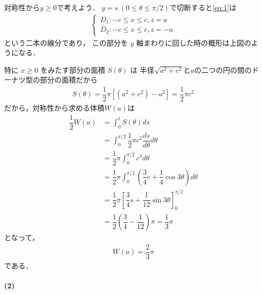 \documentclass[../../main.tex]{subfiles}
\begin{document}
対称性から$y \ge 0$で考えよう．
$y = s \ (0 \le \theta \le \pi/2)$で切断すると\cref{eq:1}は
\begin{align}
  \begin{cases}
    D_1: -c \le x \le c, z = a \\
    D_2: -c \le x \le c, z = -a
  \end{cases} \label{eq:2}
\end{align}
という二本の線分であり，
この部分を $y$ 軸まわりに回した時の概形は上図のようになる．

特に $x \ge 0$ をみたす部分の面積 $S(\theta)$ は
半径$\sqrt{a^2+c^2}$と$a$の二つの円の間のドーナツ型の部分の面積だから
\begin{align}
  S(\theta) = \dfrac{1}{2}\pi \left[ (a^2+c^2) - a^2 \right] = \dfrac{1}{2}\pi c^2
\end{align}
だから，対称性から求める体積$W(a)$は
\begin{align}
  \dfrac{1}{2} W(a)
  &= \int_{0}^{1} S(\theta) ds \\
  &= \int_{0}^{\pi/2} \dfrac{1}{2}\pi c^2 \dfrac{ds}{d\theta} d\theta \\
  &= \dfrac{1}{2}\pi \int_{0}^{\pi/2} c^3 d\theta \\
  &= \dfrac{1}{2}\pi \int_{0}^{\pi/2} \left( \dfrac{3}{4}c + \dfrac{1}{4} \cos 3\theta \right) d\theta \\
  &= \dfrac{1}{2}\pi \left[ \dfrac{3}{4}s + \dfrac{1}{12}\sin 3\theta \right]_{0}^{\pi/2} \\
  &= \dfrac{1}{2}\left(\dfrac{3}{4} - \dfrac{1}{12}\right)\pi = \dfrac{1}{3}\pi
\end{align}
となって，
\begin{align}
  W(a) = \dfrac{2}{3}\pi \label{eq:3}
\end{align}
である．

\paragraph{(2)}
\end{document}
